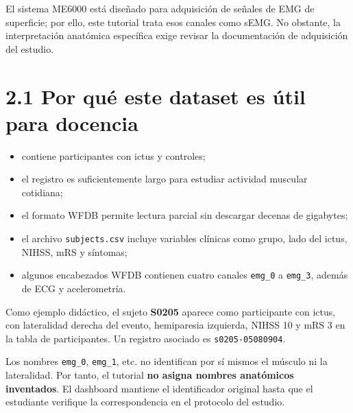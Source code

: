\documentclass[
  spanish,
  a4paper,
  DIV=11,
  numbers=noendperiod]{scrreprt}
\providecommand{\tightlist}{%
  \setlength{\itemsep}{0pt}\setlength{\parskip}{0pt}}
\begin{document}
El sistema ME6000 está diseñado para adquisición de señales de EMG de
superficie; por ello, este tutorial trata esos canales como sEMG. No
obstante, la interpretación anatómica específica exige revisar la
documentación de adquisición del estudio.

\section{2.1 Por qué este dataset es útil para
docencia}\label{por-quuxe9-este-dataset-es-uxfatil-para-docencia}

\begin{itemize}
\tightlist
\item
  contiene participantes con ictus y controles;
\item
  el registro es suficientemente largo para estudiar actividad muscular
  cotidiana;
\item
  el formato WFDB permite lectura parcial sin descargar decenas de
  gigabytes;
\item
  el archivo \texttt{subjects.csv} incluye variables clínicas como
  grupo, lado del ictus, NIHSS, mRS y síntomas;
\item
  algunos encabezados WFDB contienen cuatro canales \texttt{emg\_0} a
  \texttt{emg\_3}, además de ECG y acelerometría.
\end{itemize}

Como ejemplo didáctico, el sujeto \textbf{S0205} aparece como
participante con ictus, con lateralidad derecha del evento, hemiparesia
izquierda, NIHSS 10 y mRS 3 en la tabla de participantes. Un registro
asociado es \texttt{s0205-05080904}.

\begin{tcolorbox}[enhanced jigsaw, arc=.35mm, bottomrule=.15mm, bottomtitle=1mm, breakable, colback=white, colbacktitle=quarto-callout-warning-color!10!white, colframe=quarto-callout-warning-color-frame, coltitle=black, left=2mm, leftrule=.75mm, opacityback=0, opacitybacktitle=0.6, rightrule=.15mm, title=\textcolor{quarto-callout-warning-color}{\faExclamationTriangle}\hspace{0.5em}{Advertencia metodológica}, titlerule=0mm, toprule=.15mm, toptitle=1mm]

Los nombres \texttt{emg\_0}, \texttt{emg\_1}, etc. no identifican por sí
mismos el músculo ni la lateralidad. Por tanto, el tutorial
\textbf{no asigna nombres anatómicos inventados}. El dashboard mantiene
el identificador original hasta que el estudiante verifique la
correspondencia en el protocolo del estudio.

\end{tcolorbox}
\end{document}
